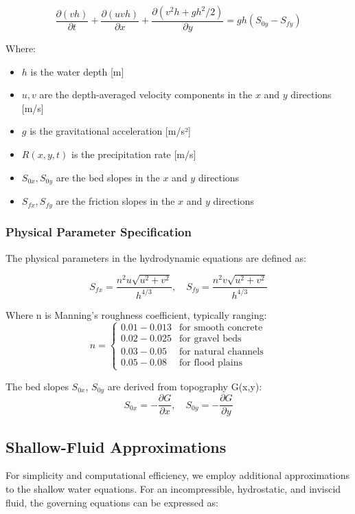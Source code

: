 \documentclass{article}
\begin{document}
\begin{equation}
\frac{\partial(vh)}{\partial t} + \frac{\partial(uvh)}{\partial x} + \frac{\partial(v^2h + gh^2/2)}{\partial y} = gh(S_{0y} - S_{fy})
\end{equation}

Where:
\begin{itemize}
    \item $h$ is the water depth [m]
    \item $u, v$ are the depth-averaged velocity components in the $x$ and $y$ directions [m/s]
    \item $g$ is the gravitational acceleration [m/s²]
    \item $R(x,y,t)$ is the precipitation rate [m/s]
    \item $S_{0x}, S_{0y}$ are the bed slopes in the $x$ and $y$ directions
    \item $S_{fx}, S_{fy}$ are the friction slopes in the $x$ and $y$ directions
\end{itemize}

\subsubsection{Physical Parameter Specification}
The physical parameters in the hydrodynamic equations are defined as:

\begin{equation}
S_{fx} = \frac{n^2u\sqrt{u^2 + v^2}}{h^{4/3}}, \quad S_{fy} = \frac{n^2v\sqrt{u^2 + v^2}}{h^{4/3}}
\end{equation}

Where n is Manning's roughness coefficient, typically ranging:
\begin{equation}
n = \begin{cases}
0.01-0.013 & \text{for smooth concrete} \\
0.02-0.025 & \text{for gravel beds} \\
0.03-0.05 & \text{for natural channels} \\
0.05-0.08 & \text{for flood plains}
\end{cases}
\end{equation}

The bed slopes $S_{0x}$, $S_{0y}$ are derived from topography G(x,y):
\begin{equation}
S_{0x} = -\frac{\partial G}{\partial x}, \quad S_{0y} = -\frac{\partial G}{\partial y}
\end{equation}

\subsection{Shallow-Fluid Approximations}
For simplicity and computational efficiency, we employ additional approximations to the shallow water equations. For an incompressible, hydrostatic, and inviscid fluid, the governing equations can be expressed as:
\end{document}

